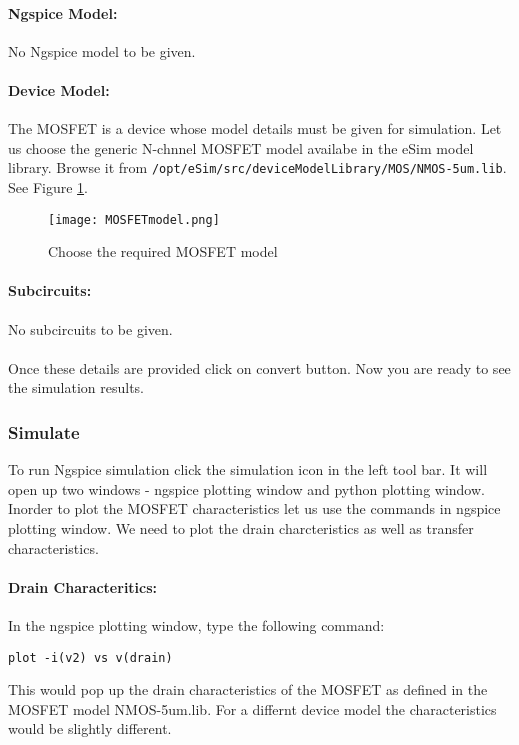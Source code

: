 \paragraph{Ngspice Model:} No Ngspice model to be given.

\paragraph{Device Model:} The MOSFET is a device whose model details must be given for simulation. Let us choose the generic N-chnnel MOSFET model availabe in the eSim model library. Browse it from \texttt{/opt/eSim/src/deviceModelLibrary/MOS/NMOS-5um.lib}. See Figure \ref{MOSFETmodel}.
\begin{figure}[h]
\centering
\texttt{[image: MOSFETmodel.png]}
\caption{Choose the required MOSFET model}
\label{MOSFETmodel}
\end{figure}

\paragraph{Subcircuits:} No subcircuits to be given.

\paragraph{}
 Once these details are provided click on convert button. %
Now you are ready to see the simulation results.

\subsubsection{Simulate} To run Ngspice simulation click the simulation icon in the left tool bar. It will open up two windows - ngspice plotting window and python plotting window. Inorder to plot the MOSFET characteristics let us use the commands in ngspice plotting window. We need to plot the drain charcteristics as well as transfer characteristics.

\paragraph{Drain Characteritics:} In the ngspice plotting window, type the following command:

\texttt{plot -i(v2) vs v(drain)}

This would pop up the drain characteristics of the MOSFET as defined in the MOSFET model NMOS-5um.lib. For a differnt device model the characteristics would be slightly different.

